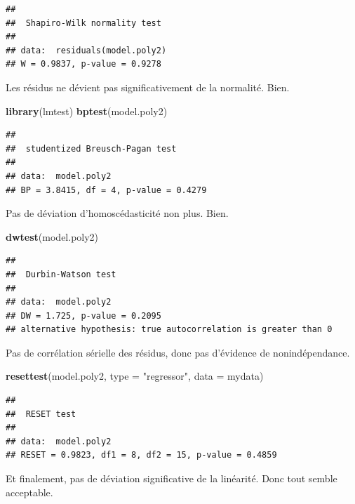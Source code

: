 \documentclass[12pt,]{book}
\newenvironment{Shaded}{\begin{snugshade}}{\end{snugshade}}
\newcommand{\DataTypeTok}[1]{\textcolor[rgb]{0.13,0.29,0.53}{#1}}
\newcommand{\KeywordTok}[1]{\textcolor[rgb]{0.13,0.29,0.53}{\textbf{#1}}}
\newcommand{\NormalTok}[1]{#1}
\newcommand{\StringTok}[1]{\textcolor[rgb]{0.31,0.60,0.02}{#1}}
\begin{document}
\begin{verbatim}
## 
##  Shapiro-Wilk normality test
## 
## data:  residuals(model.poly2)
## W = 0.9837, p-value = 0.9278
\end{verbatim}

Les résidus ne dévient pas significativement de la normalité. Bien.

\begin{Shaded}
\begin{Highlighting}[]
\KeywordTok{library}\NormalTok{(lmtest)}
\KeywordTok{bptest}\NormalTok{(model.poly2)}
\end{Highlighting}
\end{Shaded}

\begin{verbatim}
## 
##  studentized Breusch-Pagan test
## 
## data:  model.poly2
## BP = 3.8415, df = 4, p-value = 0.4279
\end{verbatim}

Pas de déviation d'homoscédasticité non plus. Bien.

\begin{Shaded}
\begin{Highlighting}[]
\KeywordTok{dwtest}\NormalTok{(model.poly2)}
\end{Highlighting}
\end{Shaded}

\begin{verbatim}
## 
##  Durbin-Watson test
## 
## data:  model.poly2
## DW = 1.725, p-value = 0.2095
## alternative hypothesis: true autocorrelation is greater than 0
\end{verbatim}

Pas de corrélation sérielle des résidus, donc pas d'évidence de nonindépendance.

\begin{Shaded}
\begin{Highlighting}[]
\KeywordTok{resettest}\NormalTok{(model.poly2, }\DataTypeTok{type =} \StringTok{"regressor"}\NormalTok{, }\DataTypeTok{data =}\NormalTok{ mydata)}
\end{Highlighting}
\end{Shaded}

\begin{verbatim}
## 
##  RESET test
## 
## data:  model.poly2
## RESET = 0.9823, df1 = 8, df2 = 15, p-value = 0.4859
\end{verbatim}

Et finalement, pas de déviation significative de la linéarité. Donc tout semble acceptable.
\end{document}
